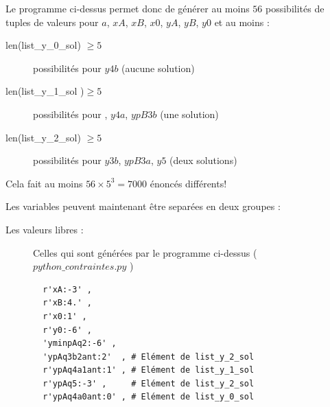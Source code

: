 {Le programme ci-dessus permet donc de générer au moins $56$ possibilités de tuples de valeurs pour $a$, $xA$, $xB$, $x0$, $yA$, $yB$, $y0$ et au moins : 
\begin{description}
 \item[len(list\_y\_0\_sol) $\geq 5$] possibilités pour $y4b$ (aucune solution)
  \item[len(list\_y\_1\_sol )$\geq 5$] possibilités pour , $y4a$, $ypB3b$ (une solution)
 \item[len(list\_y\_2\_sol) $\geq 5$] possibilités pour $y3b$, $ypB3a$, $y5$ (deux solutions)
\end{description}

Cela fait au moins $56\times 5^3 = 7000$ énoncés différents!

Les variables peuvent maintenant être separées en deux groupes : 

\begin{description}
 \item[Les valeurs libres :] Celles qui sont générées par le programme ci-dessus ( $python\_contraintes.py$ ) 
 \begin{verbatim}
  r'xA:-3' , 
  r'xB:4.' , 
  r'x0:1' ,
  r'y0:-6' ,  
  'yminpAq2:-6' ,   
  'ypAq3b2ant:2'  , # Elément de list_y_2_sol
  r'ypAq4a1ant:1' , # Elément de list_y_1_sol
  r'ypAq5:-3' ,     # Elément de list_y_2_sol
  r'ypAq4a0ant:0' , # Elément de list_y_0_sol
 \end{verbatim}


\end{description}}
